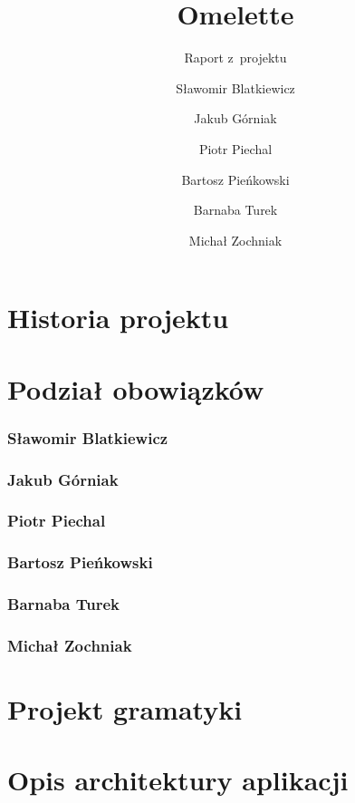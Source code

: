 \documentclass[a4paper]{scrartcl}
\let\stdpart\part
\renewcommand\part{\newpage\stdpart}
\begin{document}
\sloppy

\title{Omelette}
\subtitle{Raport z~projektu}
\author{
  Sławomir Blatkiewicz\and
  Jakub Górniak       \and
  Piotr Piechal       \and
  Bartosz Pieńkowski  \and
  Barnaba Turek       \and
  Michał Zochniak
}

\maketitle
\thispagestyle{empty}

\part{Historia projektu}



\part{Podział obowiązków}
\section{Sławomir Blatkiewicz}

\section{Jakub Górniak}

\section{Piotr Piechal}

\section{Bartosz Pieńkowski}

\section{Barnaba Turek}

\section{Michał Zochniak}


\part{Projekt gramatyki}


\part{Opis architektury aplikacji}
\end{document}
